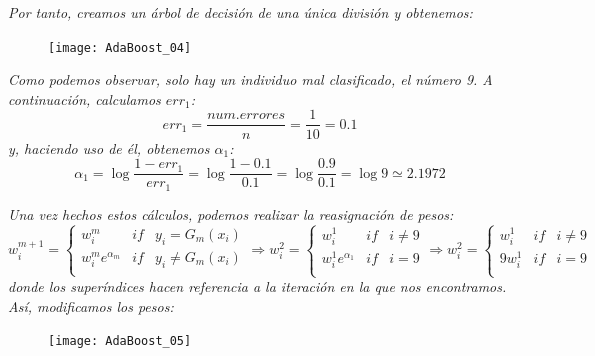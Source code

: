 \documentclass[12pt,twoside]{article}
\begin{document}
\textit{Por tanto, creamos un árbol de decisión de una única división y obtenemos:}

\begin{figure}[h]
\centering
\texttt{[image: AdaBoost\_04]}
\end{figure}

\textit{Como podemos observar, solo hay un individuo mal clasificado, el número 9. A continuación, calculamos $err_1$:}
\begin{equation*}
err_1 = \frac{num.errores}{n} = \frac{1}{10} = 0.1
\end{equation*}
\noindent
\textit{y, haciendo uso de él, obtenemos $\alpha_1$:}
\begin{equation*}
\alpha_1 = \log{\frac{1 - err_1}{err_1}} = \log{\frac{1- 0.1}{0.1}} = \log{\frac{0.9}{0.1}} = \log{9} \simeq 2.1972
\end{equation*}

\textit{Una vez hechos estos cálculos, podemos realizar la reasignación de pesos:}
\begin{equation*}
w_i^{m+1} =
\left\{
\begin{array}{crl}
w_i^m & if & y_i = G_m(x_i) \\
w_i^m e^{\alpha_m} & if & y_i \neq G_m(x_i) \\
\end{array}
\right.
\Rightarrow
w_i^{2} =
\left\{
\begin{array}{crl}
w_i^1 & if & i \neq 9 \\
w_i^1 e^{\alpha_1} & if & i = 9 \\
\end{array}
\right.
\Rightarrow
w_i^{2} =
\left\{
\begin{array}{crl}
w_i^1 & if & i \neq 9 \\
9 w_i^1  & if & i = 9 \\
\end{array}
\right.
\end{equation*}
\noindent
\textit{donde los superíndices hacen referencia a la iteración en la que nos encontramos. Así, modificamos los pesos: }
\begin{figure}[h]
\centering
\texttt{[image: AdaBoost\_05]}
\end{figure}
\end{document}
